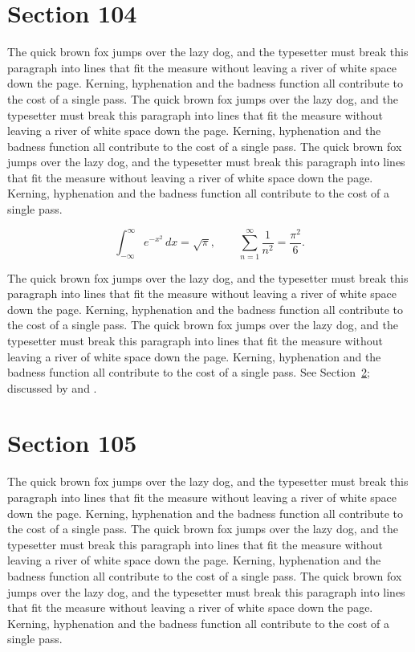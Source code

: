 \documentclass{article}
\begin{document}
\section{Section 104}
\label{sec:104}
The quick brown fox jumps over the lazy dog, and the typesetter must break this paragraph into lines that fit the measure without leaving a river of white space down the page. Kerning, hyphenation and the badness function all contribute to the cost of a single pass. The quick brown fox jumps over the lazy dog, and the typesetter must break this paragraph into lines that fit the measure without leaving a river of white space down the page. Kerning, hyphenation and the badness function all contribute to the cost of a single pass. The quick brown fox jumps over the lazy dog, and the typesetter must break this paragraph into lines that fit the measure without leaving a river of white space down the page. Kerning, hyphenation and the badness function all contribute to the cost of a single pass. 

\begin{equation}\label{eq:104}
\int_{-\infty}^{\infty} e^{-x^{2}}\,dx = \sqrt{\pi}, \qquad
\sum_{n=1}^{\infty} \frac{1}{n^{2}} = \frac{\pi^{2}}{6}.
\end{equation}

The quick brown fox jumps over the lazy dog, and the typesetter must break this paragraph into lines that fit the measure without leaving a river of white space down the page. Kerning, hyphenation and the badness function all contribute to the cost of a single pass. The quick brown fox jumps over the lazy dog, and the typesetter must break this paragraph into lines that fit the measure without leaving a river of white space down the page. Kerning, hyphenation and the badness function all contribute to the cost of a single pass. 
See Section~\ref{sec:105}; discussed by \textcite{k5} and \textcite{l2}.
\section{Section 105}
\label{sec:105}
The quick brown fox jumps over the lazy dog, and the typesetter must break this paragraph into lines that fit the measure without leaving a river of white space down the page. Kerning, hyphenation and the badness function all contribute to the cost of a single pass. The quick brown fox jumps over the lazy dog, and the typesetter must break this paragraph into lines that fit the measure without leaving a river of white space down the page. Kerning, hyphenation and the badness function all contribute to the cost of a single pass. The quick brown fox jumps over the lazy dog, and the typesetter must break this paragraph into lines that fit the measure without leaving a river of white space down the page. Kerning, hyphenation and the badness function all contribute to the cost of a single pass. 
\end{document}
